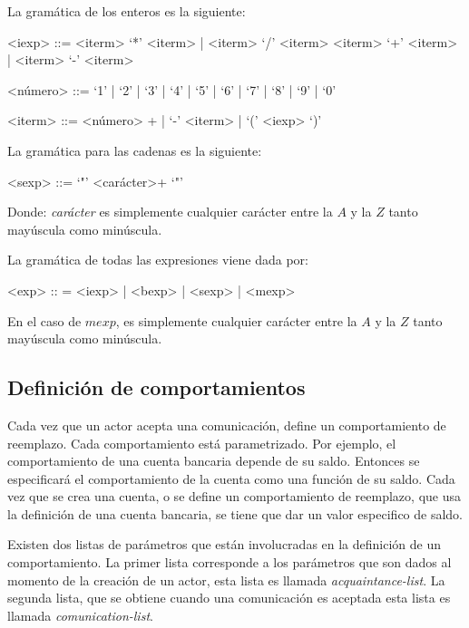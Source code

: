 La gramática de los enteros es la siguiente:

\begin{grammar}

<iexp> ::= <iterm> `*' <iterm> | <iterm> `/' <iterm> 
\alt <iterm> `+' <iterm>  | <iterm> `-' <iterm>

<número> ::= `1' | `2' | `3' | `4' | `5' | `6' | `7' | `8' | `9' | `0'

<iterm> ::= <número> + | `-' <iterm> | `(' <iexp> `)'

\end{grammar}

La gramática para las cadenas es la siguiente:

\begin{grammar}
 <sexp> ::= `"' <carácter>+ `"'
\end{grammar}

Donde: \textit{carácter} es simplemente cualquier carácter entre la $A$ y la $Z$ tanto mayúscula como minúscula.

La gramática de todas las expresiones viene dada por:

\begin{grammar}
<exp> :: = <iexp> | <bexp> | <sexp> | <mexp>  
\end{grammar}

En el caso de $mexp$, es simplemente cualquier carácter entre la $A$ y la $Z$ tanto mayúscula como minúscula. 

\subsection{Definición de comportamientos}\label{actores:beha}
Cada vez que un actor acepta una comunicación, define un comportamiento de reemplazo. Cada comportamiento está parametrizado. Por ejemplo, el comportamiento de una cuenta bancaria depende de su saldo. Entonces se especificará el comportamiento de la cuenta como una función de su saldo. Cada vez que se crea una cuenta, o se define un comportamiento de reemplazo, que usa la definición de una cuenta bancaria, se tiene que dar un valor especifico de saldo.

Existen dos listas de parámetros que están involucradas en la definición de un comportamiento. La primer lista corresponde a los parámetros que son dados al momento de la creación de un actor, esta lista es llamada \textit{acquaintance-list}. La segunda lista, que se obtiene cuando una comunicación es aceptada esta lista es llamada \textit{comunication-list}.

